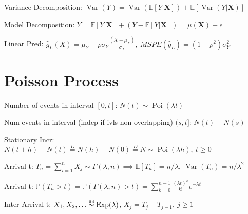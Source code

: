 \documentclass[twocolumn]{amsart}
\newcommand{\E}{\mathbb{E}}
\renewcommand{\P}{\mathbb{P}}
\newcommand{\Var}{\operatorname{Var}}
\newcommand{\Exp}{\operatorname{Exp}}
\newcommand{\Poi}{\operatorname{Poi}}
\newcommand\iid{\mathrel{\overset{\makebox[0pt]{\mbox{\normalfont\tiny iid}}}{\sim}}}
\begin{document}
Variance Decomposition: $\Var(Y) = \Var(\E[Y|\boldsymbol{X}]) + \E[\Var(Y|\boldsymbol{X})]$

Model Decomposition: $Y=\E[Y|\boldsymbol{X}] + (Y - \E[Y|\boldsymbol{X}]) = \mu(\boldsymbol{X}) + \epsilon$

Linear Pred: $\hat{g}_L(X)=\mu_{Y}+\rho\sigma_{Y}\frac{(X-\mu_X)}{\sigma_X},~MSPE(\hat{g}_L)=(1-\rho^2)\sigma^2_Y$

\section*{Poisson Process}

Number of events in interval $[0,t]$: $N(t)\sim\Poi(\lambda t)$

Num events in interval (indep if ivls non-overlapping) $(s, t]$: $N(t)-N(s)$

Stationary Incr:
$N(t+h)-N(t)\overset{D}{=}N(h)-N(0)\overset{D}{=}N\sim\Poi(\lambda h),~t\geq 0$

Arrival t: $T_n=\sum_{i=1}^n X_j \sim \Gamma(\lambda, n)\implies \E[T_n]=n/\lambda,~\Var(T_n)=n/\lambda^2$

Arrival t: $\P(T_n > t) = \P(\Gamma(\lambda, n) > t) =
\sum_{k=0}^{n-1}\frac{(\lambda t)^k}{k!}e^{-\lambda t}$

Inter Arrival t: $X_1,X_2,\ldots\iid\Exp(\lambda)$, $X_j=T_j-T_{j-1},~j\geq 1$
\end{document}
